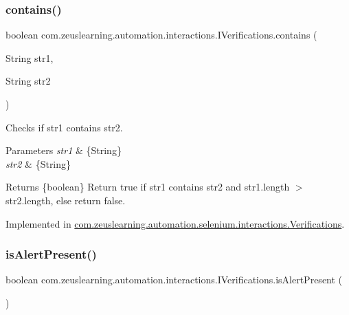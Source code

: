 \subsubsection{\texorpdfstring{contains()}{contains()}}
{\footnotesize\ttfamily boolean com.\+zeuslearning.\+automation.\+interactions.\+I\+Verifications.\+contains (\begin{DoxyParamCaption}\item[{String}]{str1,  }\item[{String}]{str2 }\end{DoxyParamCaption})}

Checks if str1 contains str2.


\begin{DoxyParams}{Parameters}
{\em str1} & \{String\} \\
\hline
{\em str2} & \{String\} \\
\hline
\end{DoxyParams}
\begin{DoxyReturn}{Returns}
\{boolean\} Return true if str1 contains str2 and str1.\+length $>$ str2.\+length, else return false. 
\end{DoxyReturn}


Implemented in \hyperlink{classcom_1_1zeuslearning_1_1automation_1_1selenium_1_1interactions_1_1Verifications_a5e29c5310810934f0e069203e35e31bc}{com.\+zeuslearning.\+automation.\+selenium.\+interactions.\+Verifications}.

\hypertarget{interfacecom_1_1zeuslearning_1_1automation_1_1interactions_1_1IVerifications_aec38d25880abb184e78864f6ac03a4e8}{}\label{interfacecom_1_1zeuslearning_1_1automation_1_1interactions_1_1IVerifications_aec38d25880abb184e78864f6ac03a4e8} 
\subsubsection{\texorpdfstring{is\+Alert\+Present()}{isAlertPresent()}}
{\footnotesize\ttfamily boolean com.\+zeuslearning.\+automation.\+interactions.\+I\+Verifications.\+is\+Alert\+Present (\begin{DoxyParamCaption}{ }\end{DoxyParamCaption})}

